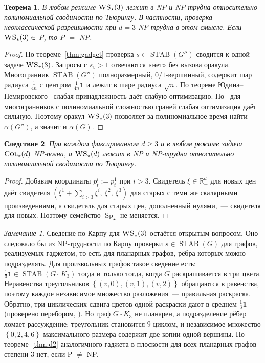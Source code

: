 \documentclass[a4paper,11pt]{article}
\theoremstyle{plain}
\newtheorem{theorem}{Теорема}[section]
\newtheorem{corollary}[theorem]{Следствие}
\theoremstyle{definition}
\theoremstyle{remark}
\newtheorem*{remark}{Замечание}
\newcommand{\R}{\mathbb{R}}
\newcommand{\set}[1]{\left\{ #1 \right\}}
\newcommand{\Rp}[1][2]{\R^{#1}_{+}}
\DeclareMathOperator{\Sp}{Sp}
\DeclareMathOperator{\STAB}{STAB}
\newcommand{\WS}{\textsc{WS}}
\newcommand{\COL}{\textsc{Col}}
\newcommand{\Spm}{\Sp_\star}
\begin{document}
\begin{theorem}\label{thm:ws}
    В любом режиме $\WS_\star(3)$ лежит в NP и NP-трудна относительно полиномиальной сводимости по Тьюрингу. В частности, проверка неоклассической разрешимости при $d=3$ NP-трудна в этом смысле. Если $\WS_\star(3)\in$ P, то P $=$ NP.
\end{theorem}

\begin{proof}
    По теореме~\ref{thm:gadget} проверка $s\in\STAB(G'')$ сводится к одной задаче $\WS_\star(3)$. Запросы с $s_v>1$ отвечаются «нет» без вызова оракула. Многогранник $\STAB(G'')$ полноразмерный, $0/1$-вершинный, содержит шар радиуса $\tfrac1{4n}$ с центром $\tfrac1{4n}\mathbf 1$ и лежит в шаре радиуса $\sqrt n$. По теореме Юдина--Немировского~\cite[теорема~4.3.2]{GLS} слабая принадлежность даёт слабую оптимизацию. По~\cite[теорема~6.3.2]{GLS} для многогранников с полиномиальной сложностью граней слабая оптимизация даёт сильную. Поэтому оракул $\WS_\star(3)$ позволяет за полиномиальное время найти $\alpha(G'')$, а значит и $\alpha(G)$.
\end{proof}

\begin{corollary}
    При каждом фиксированном $d\ge3$ и в любом режиме задача $\COL_\star(d)$ NP-полна, а $\WS_\star(d)$ лежит в NP и NP-трудна относительно полиномиальной сводимости по Тьюрингу.
\end{corollary}

\begin{proof}
    Добавим координаты $p^i_t:=p^1_t$ при $i>3$. Свидетель $\xi\in\Rp[d]$ для новых цен даёт свидетеля $(\xi^1+\sum_{i>3}\xi^i,\ \xi^2,\ \xi^3)$ для старых с теми же скалярными произведениями, а свидетель для старых цен, дополненный нулями,~--- свидетеля для новых. Поэтому семейство $\Spm$ не меняется.
\end{proof}

\begin{remark}
    Сведение по Карпу для $\WS_\star(3)$ остаётся открытым вопросом. Оно следовало бы из NP-трудности по Карпу проверки $s\in\STAB(G)$ для графов, реализуемых гаджетом, то есть для планарных графов, рёбра которых можно подразделять. Для произвольных графов такое сведение есть: $\tfrac13\mathbf 1\in\STAB(G\,\square\,K_3)$ тогда и только тогда, когда $G$ раскрашивается в три цвета. Неравенства треугольников $\set{(v,0),(v,1),(v,2)}$ обращаются в равенства, поэтому каждое независимое множество разложения~--- правильная раскраска. Обратно, три циклических сдвига цветов одной раскраски дают в среднем $\tfrac13\mathbf 1$ (проверено перебором, ). Но граф $G\,\square\,K_3$ не планарен, а подразделение рёбер ломает рассуждение: треугольник становится $9$-циклом, и независимое множество $\set{0,2,4,6}$ максимального размера содержит две копии одной вершины. По теореме~\ref{thm:d2} аналогичного гаджета в плоскости для всех планарных графов степени $3$ нет, если P $\ne$ NP.
\end{remark}
\end{document}
